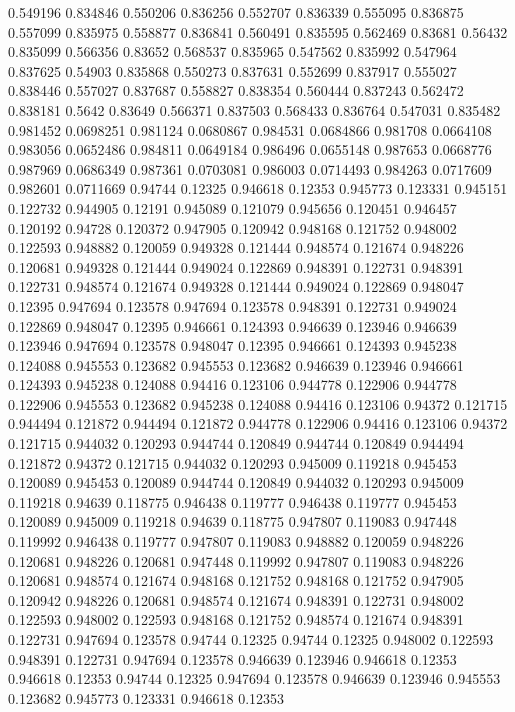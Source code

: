 0.549196 0.834846
0.550206 0.836256
0.552707 0.836339
0.555095 0.836875
0.557099 0.835975
0.558877 0.836841
0.560491 0.835595
0.562469 0.83681
0.56432 0.835099
0.566356 0.83652
0.568537 0.835965
0.547562 0.835992
0.547964 0.837625
0.54903 0.835868
0.550273 0.837631
0.552699 0.837917
0.555027 0.838446
0.557027 0.837687
0.558827 0.838354
0.560444 0.837243
0.562472 0.838181
0.5642 0.83649
0.566371 0.837503
0.568433 0.836764
0.547031 0.835482
0.981452 0.0698251
0.981124 0.0680867
0.984531 0.0684866
0.981708 0.0664108
0.983056 0.0652486
0.984811 0.0649184
0.986496 0.0655148
0.987653 0.0668776
0.987969 0.0686349
0.987361 0.0703081
0.986003 0.0714493
0.984263 0.0717609
0.982601 0.0711669
0.94744 0.12325
0.946618 0.12353
0.945773 0.123331
0.945151 0.122732
0.944905 0.12191
0.945089 0.121079
0.945656 0.120451
0.946457 0.120192
0.94728 0.120372
0.947905 0.120942
0.948168 0.121752
0.948002 0.122593
0.948882 0.120059
0.949328 0.121444
0.948574 0.121674
0.948226 0.120681
0.949328 0.121444
0.949024 0.122869
0.948391 0.122731
0.948391 0.122731
0.948574 0.121674
0.949328 0.121444
0.949024 0.122869
0.948047 0.12395
0.947694 0.123578
0.947694 0.123578
0.948391 0.122731
0.949024 0.122869
0.948047 0.12395
0.946661 0.124393
0.946639 0.123946
0.946639 0.123946
0.947694 0.123578
0.948047 0.12395
0.946661 0.124393
0.945238 0.124088
0.945553 0.123682
0.945553 0.123682
0.946639 0.123946
0.946661 0.124393
0.945238 0.124088
0.94416 0.123106
0.944778 0.122906
0.944778 0.122906
0.945553 0.123682
0.945238 0.124088
0.94416 0.123106
0.94372 0.121715
0.944494 0.121872
0.944494 0.121872
0.944778 0.122906
0.94416 0.123106
0.94372 0.121715
0.944032 0.120293
0.944744 0.120849
0.944744 0.120849
0.944494 0.121872
0.94372 0.121715
0.944032 0.120293
0.945009 0.119218
0.945453 0.120089
0.945453 0.120089
0.944744 0.120849
0.944032 0.120293
0.945009 0.119218
0.94639 0.118775
0.946438 0.119777
0.946438 0.119777
0.945453 0.120089
0.945009 0.119218
0.94639 0.118775
0.947807 0.119083
0.947448 0.119992
0.946438 0.119777
0.947807 0.119083
0.948882 0.120059
0.948226 0.120681
0.948226 0.120681
0.947448 0.119992
0.947807 0.119083
0.948226 0.120681
0.948574 0.121674
0.948168 0.121752
0.948168 0.121752
0.947905 0.120942
0.948226 0.120681
0.948574 0.121674
0.948391 0.122731
0.948002 0.122593
0.948002 0.122593
0.948168 0.121752
0.948574 0.121674
0.948391 0.122731
0.947694 0.123578
0.94744 0.12325
0.94744 0.12325
0.948002 0.122593
0.948391 0.122731
0.947694 0.123578
0.946639 0.123946
0.946618 0.12353
0.946618 0.12353
0.94744 0.12325
0.947694 0.123578
0.946639 0.123946
0.945553 0.123682
0.945773 0.123331
0.946618 0.12353
